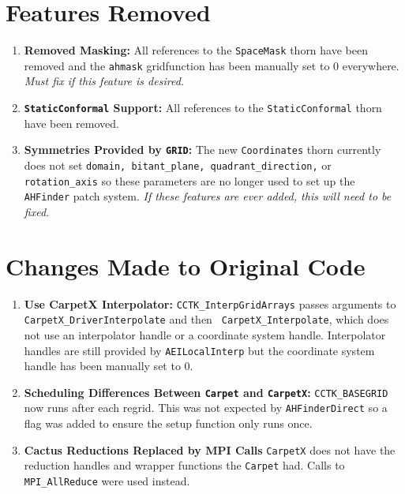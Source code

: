 \def\I{{\text{\scriptsize I}}}                  %
\def\J{{\text{\scriptsize J}}}                  %
\def\K{{\text{\scriptsize K}}}                  %
\def\M{{\text{\scriptsize M}}}                  %

\def\Jac[#1]{{\bf J} \bigl[ #1 \bigr]}          %

\section{Features Removed}
\begin{enumerate}
\item \textbf{Removed Masking:}
    All references to the \texttt{SpaceMask} thorn have been removed and the \texttt{ahmask} gridfunction has been manually set to 0 everywhere. \textit{Must fix if this feature is desired.}

\item \textbf{\texttt{StaticConformal} Support:}
    All references to the \texttt{StaticConformal} thorn have been  removed.

\item \textbf{Symmetries Provided by \texttt{GRID}:}
    The new \texttt{Coordinates} thorn currently does not set \texttt{domain, bitant\_plane, quadrant\_direction,} or \texttt{rotation\_axis} so these parameters are no longer used to set up the \texttt{AHFinder} patch system. \textit{If these features are ever added, this will need to be fixed.}
    
\end{enumerate}

\section{Changes Made to Original Code}
\begin{enumerate}
\item \textbf{Use CarpetX Interpolator:}
    \texttt{CCTK\_InterpGridArrays} passes arguments to \texttt{ CarpetX\_DriverInterpolate} and then \texttt{ CarpetX\_Interpolate}, which does not use an interpolator handle or a coordinate system handle. Interpolator handles are still provided by \texttt{AEILocalInterp} but the coordinate system handle has been manually set to 0.

\item \textbf{Scheduling Differences Between \texttt{Carpet} and \texttt{CarpetX}:}
    \texttt{CCTK\_BASEGRID} now runs after each regrid. This was not expected by \texttt{AHFinderDirect} so a flag was added to ensure the setup function only runs once.

\item \textbf{Cactus Reductions Replaced by MPI Calls}
    \texttt{CarpetX} does not have the reduction handles and wrapper functions the \texttt{Carpet} had. Calls to \texttt{MPI\_AllReduce} were used instead.

\end{enumerate}

